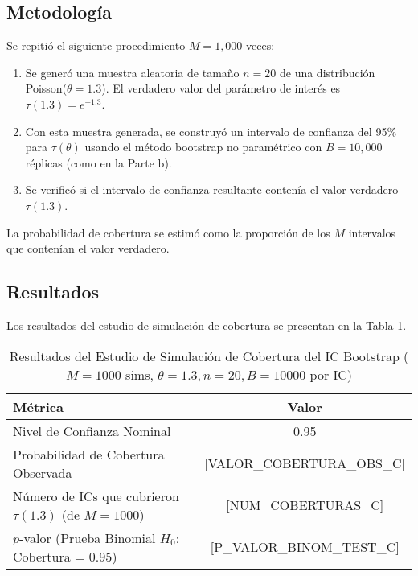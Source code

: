 \documentclass[11pt,a4paper]{article}
\begin{document}
\subsection{Metodología}
Se repitió el siguiente procedimiento $M=1,000$ veces:
\begin{enumerate}
    \item Se generó una muestra aleatoria de tamaño $n=20$ de una distribución Poisson($\theta=1.3$). El verdadero valor del parámetro de interés es $\tau(1.3) = e^{-1.3}$.
    \item Con esta muestra generada, se construyó un intervalo de confianza del 95\% para $\tau(\theta)$ usando el método bootstrap no paramétrico con $B=10,000$ réplicas (como en la Parte b).
    \item Se verificó si el intervalo de confianza resultante contenía el valor verdadero $\tau(1.3)$.
\end{enumerate}
La probabilidad de cobertura se estimó como la proporción de los $M$ intervalos que contenían el valor verdadero.

\subsection{Resultados}
Los resultados del estudio de simulación de cobertura se presentan en la Tabla \ref{tab:coverage_results_c}.

\begin{table}[H]
    \centering
    \caption{Resultados del Estudio de Simulación de Cobertura del IC Bootstrap ($M=1000$ sims, $\theta=1.3, n=20, B=10000$ por IC)}
    \label{tab:coverage_results_c}
    \begin{tabular}{lc}
        \toprule
        Métrica & Valor \\
        \midrule
        Nivel de Confianza Nominal & 0.95 \\
        Probabilidad de Cobertura Observada & [VALOR_COBERTURA_OBS_C] \\
        Número de ICs que cubrieron $\tau(1.3)$ (de $M=1000$) & [NUM_COBERTURAS_C] \\
        $p$-valor (Prueba Binomial $H_0$: Cobertura = 0.95) & [P_VALOR_BINOM_TEST_C] \\
        \bottomrule
    \end{tabular}
\end{table}




\vspace{2em}
\hrulefill
\end{document}
